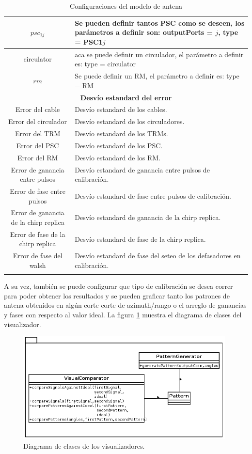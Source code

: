 \begin{center}
\begin{longtable}{|c|p{9cm}|}
	$psc_{1j}$ & Se pueden definir tantos PSC como se deseen, los parámetros a definir son: outputPorts = $j$, type = PSC1$j$ \tabularnewline \hline 
	circulator & aca se puede definir un circulador, el parámetro a definir es: type = circulator \tabularnewline \hline 
	$rm$ & Se puede definir un RM, el parámetro a definir es: type = RM \tabularnewline \hline 
	\multicolumn{2}{|c|}{\textbf{Desvío estandard del error}} \\
	\hline
	Error del cable & Desvío estandard de los cables. \tabularnewline \hline 
	Error del circulador & Desvío estandard de los circuladores. \tabularnewline \hline 
	Error del TRM & Desvío estandard de los TRMs. \tabularnewline \hline 
	Error del PSC & Desvío estandard de los PSC. \tabularnewline \hline 
	Error del RM & Desvío estandard de los RM. \tabularnewline \hline 
	Error de ganancia entre pulsos & Desvío estandard de ganancia entre pulsos de calibración. \tabularnewline \hline 
	Error de fase entre pulsos & Desvío estandard de fase entre pulsos de calibración. \tabularnewline \hline 
	Error de ganancia de la chirp replica & Desvío estandard de ganancia de la chirp replica. \tabularnewline \hline 
	Error de fase de la chirp replica & Desvío estandard de fase de la chirp replica. \tabularnewline \hline 
	Error de fase del walsh & Desvío estandard de fase del seteo de los defasadores en calibración. \tabularnewline \hline 
	\caption{Configuraciones del modelo de antena}
  \end{longtable}
  \label{tab:conf_modelo_antena}
\end{center}

A su vez, también se puede configurar que tipo de calibración se desea correr para poder obtener los resultados y se pueden 
graficar tanto los patrones de antena obtenidos en algún corte corte de azimuth/rango o el arreglo de ganancias y fases con 
respecto al valor ideal. La figura \ref{fig:visualPackage} muestra el diagrama de clases del visualizador.

\begin{figure}[H]
 \centering
 \includegraphics[width=11cm]{gfx/visualPackage.png}
 \caption{Diagrama de clases de los visualizadores.}
 \label{fig:visualPackage}
\end{figure}

